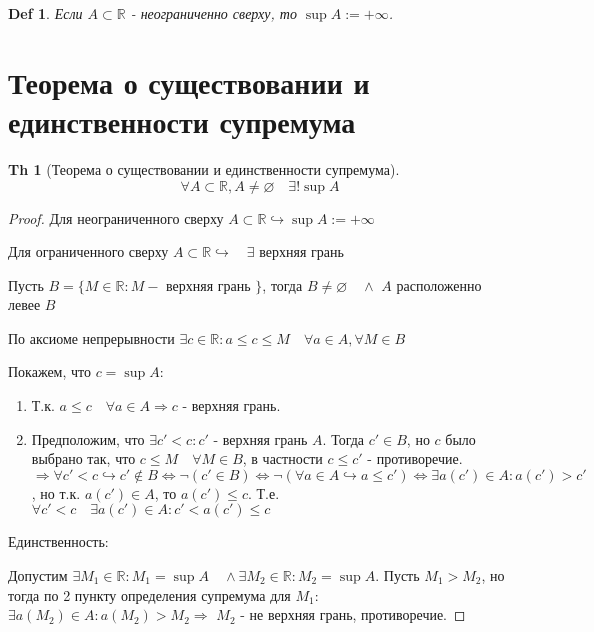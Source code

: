 \documentclass[a5paper, 10pt]{article}
\theoremstyle{plain}
\newtheorem*{theorem}{Th}
\newtheorem{definition}{Def}
\newcommand{\R}{\mathbb R}
\newcommand{\hrarrow}{\hookrightarrow}
\newcommand{\Rarrow}{\Rightarrow}
\newcommand{\Lrarrow}{\Leftrightarrow}
\begin{document}
    \begin{definition}
    Если $ A \subset \R $ - неограниченно сверху, то $ \sup A := +\infty $.
    \end{definition}

    \section{Теорема о существовании и единственности супремума}

    \begin{theorem}[Теорема о существовании и единственности супремума]

    \[ \forall A \subset \R, A \neq \varnothing \quad \exists! \sup A \]
    \end{theorem}

    \begin{proof}
        Для неограниченного сверху $ A \subset \R \hrarrow \sup A := +\infty $

        Для ограниченного сверху $ A \subset \R \hrarrow \quad \exists $ верхняя грань

        Пусть $ B = \{ M \in \R: M - $ верхняя грань $ \} $, тогда
        $ B \neq \varnothing \quad \land $
        $ A $ расположенно левее $ B $

        По аксиоме непрерывности $ \exists c \in \R: a \leq c \leq M \quad
        \forall a \in A, \forall M \in B $

        Покажем, что $ c = \sup A: $

        \begin{enumerate}
            \item Т.к. $ a \leq c \quad \forall a \in A \Rarrow c $ - верхняя грань.
            \item Предположим, что $ \exists c' < c: c' $ - верхняя грань $ A $.
                Тогда $ c' \in B $, но $ c $ было выбрано так, что $ c \leq M \quad \forall M \in B $,
                в частности $ c \leq c' $ - противоречие.
                $ \Rarrow \forall c' < c \hrarrow
                    c' \notin B \Lrarrow
                    \neg \left(c' \in B \right) \Lrarrow
                    \neg(\forall a \in A \hrarrow a \leq c') \Lrarrow
                    \exists a(c') \in A: a(c') > c' $,
                    но т.к. $ a(c') \in A $, то $ a(c') \leq c $.
                    Т.е. $ \forall c' < c \quad \exists a(c') \in A: c' < a(c') \leq c $
        \end{enumerate}

        Единственность:

        Допустим $ \exists M_1 \in \R: M_1 = \sup A \quad \land \exists M_2 \in \R: M_2 = \sup A $.
        Пусть $ M_1 > M_2 $, но тогда по 2 пункту определения супремума для $ M_1 $:
        $ \exists a(M_2) \in A: a(M_2) > M_2 \Rarrow $ $ M_2 $ - не верхняя грань, противоречие.
    \end{proof}
\end{document}

